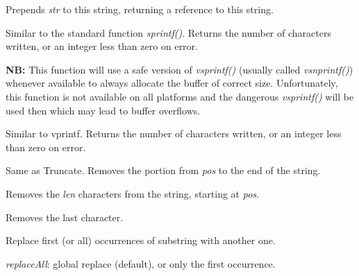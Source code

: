 \label{wxstringprepend}


Prepends {\it str} to this string, returning a reference to this string.

\label{wxstringprintf}


Similar to the standard function {\it sprintf()}. Returns the number of
characters written, or an integer less than zero on error.

{\bf NB:} This function will use a safe version of {\it vsprintf()} (usually called 
{\it vsnprintf()}) whenever available to always allocate the buffer of correct
size. Unfortunately, this function is not available on all platforms and the
dangerous {\it vsprintf()} will be used then which may lead to buffer overflows.

\label{wxstringprintfv}


Similar to vprintf. Returns the number of characters written, or an integer less than zero
on error.

\label{wxstringremove}


Same as Truncate. Removes the portion from {\it pos} to the end of the string.


Removes the {\it len} characters from the string, starting at {\it pos}.

\label{wxstringremovelast}


Removes the last character.

\label{wxstringreplace}


Replace first (or all) occurrences of substring with another one.

{\it replaceAll}: global replace (default), or only the first occurrence.

